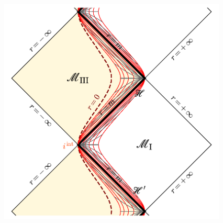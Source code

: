 \begin{figure}
\begin{minipage}[c]{0.6\textwidth}
\includegraphics[width=\textwidth]{exk_NH_region.pdf} \\[1ex]
\
\end{minipage}
\hfill
\begin{minipage}[c]{0.35\textwidth}

\end{minipage}
\end{figure}
